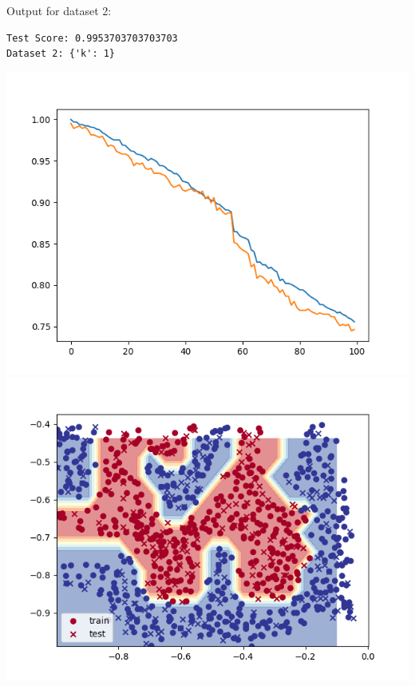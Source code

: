     Output for dataset 2:
    \begin{verbatim}
Test Score: 0.9953703703703703
Dataset 2: {'k': 1}
    \end{verbatim}
    \includegraphics[width=\textwidth / 2]{plots/kmeans_loss_2}
    \includegraphics[width=\textwidth / 2]{plots/kmeans_boundary_2}

